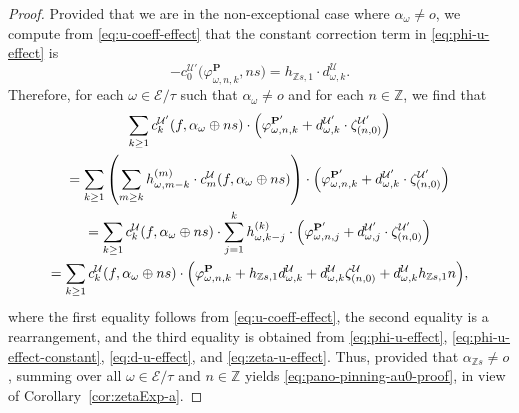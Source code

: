 \documentclass[preprint,12pt]{elsarticle}
\numberwithin{equation}{section} %
\theoremstyle{theorem}
\theoremstyle{definition}
\newcommand{\ec}{\mathcal{E}} %
\newcommand{\idec}{{o}} %
\newcommand{\orbita}{{\ec/\tau}} %
\newcommand{\Z}{\mathbb{Z}} %
\newcommand{\za}[2]{\zeta^{\mathcal{U}}_{( {#1} , {#2} )}}
\begin{document}
\begin{proof}
    Provided that we are in the non-exceptional case where $\alpha_\omega\neq\idec$, we compute from \eqref{eq:u-coeff-effect} that the constant correction term in \eqref{eq:phi-u-effect} is \begin{equation}\label{eq:phi-u-effect-constant}
        -c_0^{\mathcal{U}'}\bigl(\varphi^\mathbf{P}_{\omega,n,k},ns\bigr)=h_{\Z s,1}\cdot d^\mathcal{U}_{\omega,k}.
    \end{equation} Therefore, for each $\omega\in\orbita$ such that $\alpha_\omega\neq\idec$ and for each $n\in \Z$, we find that \begin{multline}\label{eq:pano-pinning-au0-long-computation-nice}
    \sum_{k\geq 1} c^{\mathcal{U}'}_k(f,\alpha_\omega\oplus ns)\cdot\Bigl(\varphi^{\mathbf{P}'}_{\omega,n,k}+d^{\mathcal{U}'}_{\omega,k}\cdot\zeta^{\mathcal{U}'}_{(n,0)}\Bigr)\\
      =\sum_{k\geq 1}\left(\sum_{m\geq k} h^{(m)}_{\omega,m-k}\cdot c^{\mathcal{U}}_m(f,\alpha_\omega\oplus ns)\right)\cdot\Bigl(\varphi^{\mathbf{P}'}_{\omega,n,k}+d^{\mathcal{U}'}_{\omega,k}\cdot\zeta^{\mathcal{U}'}_{(n,0)}\Bigr) \\
      =\sum_{k\geq 1}c_k^\mathcal{U}(f,\alpha_\omega\oplus ns)\cdot\sum_{j=1}^k h^{(k)}_{\omega,k-j}\cdot\Bigl(\varphi^{\mathbf{P}'}_{\omega,n,j}+d^{\mathcal{U}'}_{\omega,j}\cdot\zeta^{\mathcal{U}'}_{(n,0)}\Bigr)\\
      =\sum_{k\geq 1}c_k^\mathcal{U}(f,\alpha_\omega\oplus ns)\cdot\Bigl(\varphi^\mathbf{P}_{\omega,n,k}+h_{\Z s,1}d_{\omega,k}^{\mathcal{U}}+d^\mathcal{U}_{\omega,k}\za{n}{0}+d^{\mathcal{U}}_{\omega,k}h_{\Z s,1}n\Bigr),
    \end{multline} where the first equality follows from \eqref{eq:u-coeff-effect}, the second equality is a rearrangement, and the third equality is obtained from \eqref{eq:phi-u-effect}, \eqref{eq:phi-u-effect-constant},  \eqref{eq:d-u-effect}, and \eqref{eq:zeta-u-effect}. Thus, provided that $\alpha_{\Z s}\neq\idec$, summing over all $\omega\in\orbita$ and $n\in\Z$ yields \eqref{eq:pano-pinning-au0-proof}, in view of Corollary~\ref{cor:zetaExp-a}.


\end{proof}
\end{document}
